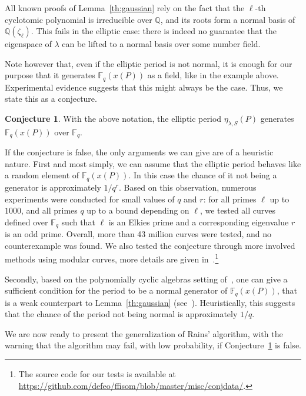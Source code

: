 \documentclass{mcom-l}
\theoremstyle{plain}
\theoremstyle{definition}
\newtheorem{conjecture}[theorem]{Conjecture}
\newcommand{\Q}{\ensuremath{\mathbb{Q}}}
\newcommand{\F}{\ensuremath{\mathbb{F}}}
\newcounter{algorithm}
\begin{document}
All known proofs of Lemma~\ref{th:gaussian} rely on the fact that
the $\ell$-th cyclotomic polynomial is irreducible over $\Q$, and its
roots form a normal basis of $\Q(\zeta_\ell)$. %
This fails in the elliptic case: there is indeed no guarantee that the
eigenspace of $\lambda$ can be lifted to a normal basis over some
number field.

Note however that, even if the elliptic period is not normal, it is
enough for our purpose that it generates $\F_q(x(P))$ as a field, like
in the example above.
Experimental evidence suggests that this might always be the
case.
Thus, we state this as a conjecture.

\begin{conjecture}
\label{conj:ellperiods}
With the above notation, the elliptic period $\eta_{\lambda,S}(P)$
generates $\F_q(x(P))$ over $\F_q$.
\end{conjecture}

If the conjecture is false, the only arguments we can give are of a
heuristic nature.  First and most simply, we can assume that the
elliptic period behaves like a random element of $\F_q(x(P))$. In this
case the chance of it not being a generator is approximately
$1/q^r$. %
Based on this observation, numerous experiments were conducted for
small values of $q$ and $r$: for all primes $\ell$ up to $1000$,
and all primes $q$ up to a bound depending on $\ell$,
we tested all curves defined over $\F_q$ such that $\ell$
is an Elkies prime and a corresponding eigenvalue $r$
is an odd prime. %
Overall, more than 43 million curves were tested, and no
counterexample was found. %
We also tested the conjecture through more involved methods using
modular curves, more details are given
in~\cite[Appendix~C.2]{ffisom-long}.\footnote{The source code for our
  tests is available at
  \url{https://github.com/defeo/ffisom/blob/master/misc/conjdata/}.} %

Secondly, based on the polynomially cyclic algebras setting
of~\cite{Mihailescu2010825}, one can give a sufficient
condition for the period to be a normal generator of
$\F_q(x(P))$, that is a weak counterpart to Lemma~\ref{th:gaussian}
(see~\cite[Appendix~C.1]{ffisom-long}). %
Heuristically, this suggests that the
chance of the period not being normal is approximately $1/q$.

We are now ready to present the generalization of Rains' algorithm,
with the warning that the algorithm may fail, with low probability, if
Conjecture~\ref{conj:ellperiods} is false.
\end{document}

